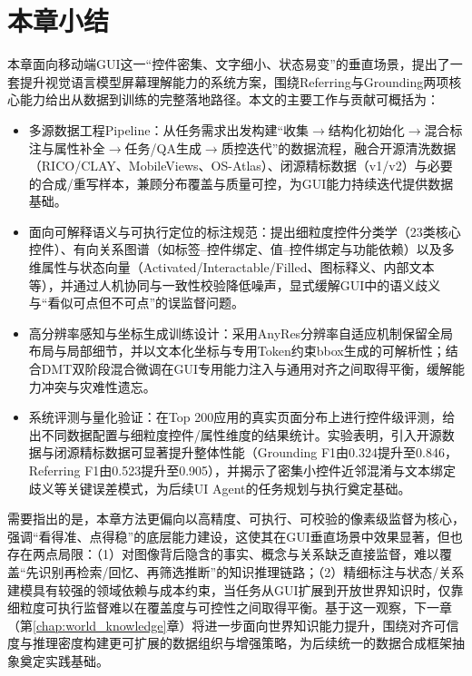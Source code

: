 \section{本章小结}
本章面向移动端GUI这一“控件密集、文字细小、状态易变”的垂直场景，提出了一套提升视觉语言模型屏幕理解能力的系统方案，围绕Referring与Grounding两项核心能力给出从数据到训练的完整落地路径。本文的主要工作与贡献可概括为：
\begin{itemize}
  \item 多源数据工程Pipeline：从任务需求出发构建“收集$\rightarrow$结构化初始化$\rightarrow$混合标注与属性补全$\rightarrow$任务/QA生成$\rightarrow$质控迭代”的数据流程，融合开源清洗数据（RICO/CLAY、MobileViews、OS-Atlas）\citep{deka2017rico,li2022clay,gao2024mobileviews,wu2024osatlas}、闭源精标数据（v1/v2）与必要的合成/重写样本，兼顾分布覆盖与质量可控，为GUI能力持续迭代提供数据基础。
  \item 面向可解释语义与可执行定位的标注规范：提出细粒度控件分类学（23类核心控件）、有向关系图谱（如标签--控件绑定、值--控件绑定与功能依赖）以及多维属性与状态向量（Activated/\allowbreak Interactable/\allowbreak Filled、图标释义、内部文本等），并通过人机协同与一致性校验降低噪声，显式缓解GUI中的语义歧义与“看似可点但不可点”的误监督问题。
  \item 高分辨率感知与坐标生成训练设计：采用AnyRes分辨率自适应机制保留全局布局与局部细节，并以文本化坐标与专用Token约束bbox生成的可解析性；结合DMT双阶段混合微调在GUI专用能力注入与通用对齐之间取得平衡，缓解能力冲突与灾难性遗忘。
  \item 系统评测与量化验证：在Top 200应用的真实页面分布上进行控件级评测，给出不同数据配置与细粒度控件/属性维度的结果统计。实验表明，引入开源数据与闭源精标数据可显著提升整体性能（Grounding F1由0.324提升至0.846，Referring F1由0.523提升至0.905），并揭示了密集小控件近邻混淆与文本绑定歧义等关键误差模式，为后续UI Agent的任务规划与执行奠定基础。
\end{itemize}

需要指出的是，本章方法更偏向以高精度、可执行、可校验的像素级监督为核心，强调“看得准、点得稳”的底层能力建设，这使其在GUI垂直场景中效果显著，但也存在两点局限：（1）对图像背后隐含的事实、概念与关系缺乏直接监督，难以覆盖“先识别再检索/回忆、再筛选推断”的知识推理链路；（2）精细标注与状态/关系建模具有较强的领域依赖与成本约束，当任务从GUI扩展到开放世界知识时，仅靠细粒度可执行监督难以在覆盖度与可控性之间取得平衡。基于这一观察，下一章（第\ref{chap:world_knowledge}章）将进一步面向世界知识能力提升，围绕对齐可信度与推理密度构建更可扩展的数据组织与增强策略，为后续统一的数据合成框架抽象奠定实践基础。
